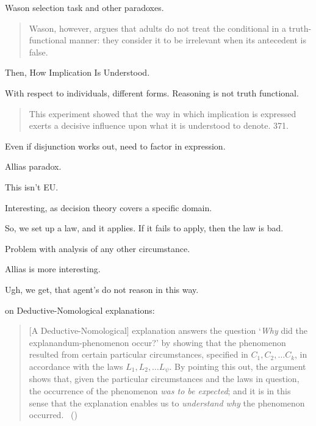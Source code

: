 \begin{note}
  Wason selection task and other paradoxes.

  \begin{quote}
    Wason, however, argues that adults do not treat the conditional in a truth-functional manner: they consider it to be irrelevant when its antecedent is false.
  \end{quote}

  Then, How Implication Is Understood.

  With respect to individuals, different forms.
  Reasoning is not truth functional.

  \begin{quote}
    This experiment showed that the way in which implication is expressed exerts a decisive influence upon what it is understood to denote.
    371.
  \end{quote}

  Even if disjunction works out, need to factor in expression.

  Allias paradox.

  This isn't EU.

  Interesting, as decision theory covers a specific domain.
\end{note}

\begin{note}
  So, we set up a law, and it applies.
  If it fails to apply, then the law is bad.

  Problem with analysis of any other circumstance.

  Allias is more interesting.
\end{note}

\begin{note}
  Ugh, we get, that agent's do not reason in this way.
\end{note}

\begin{note}
  \citeauthor{Hempel:1965aa} on Deductive-Nomological explanations:

  \begin{quote}
    [A Deductive-Nomological] explanation answers the question
    `\emph{Why} did the explanandum-phenomenon occur?'
    by showing that the phenomenon resulted from certain particular circumstances, specified in \(C_{1}, C_{2}, \dots C_{k}\), in accordance with the laws \(L_{1}, L_{2}, \dots L_{\psi}\).
    By pointing this out, the argument shows that, given the particular circumstances and the laws in question, the occurrence of the phenomenon \emph{was to be expected}; and it is in this sense that the explanation enables us to \emph{understand why} the phenomenon occurred.\newline
    \mbox{ }\hfill\mbox{(\citeyear[337]{Hempel:1965aa})}
  \end{quote}
\end{note}


